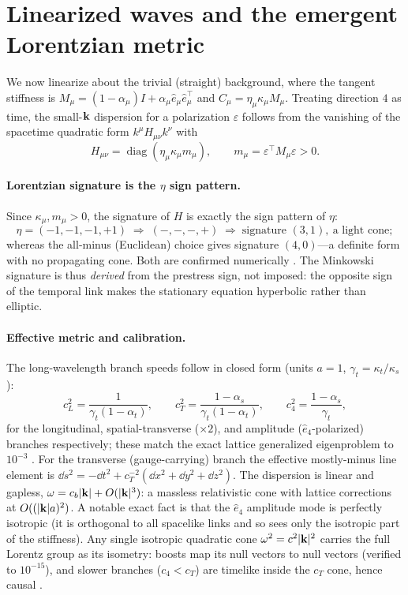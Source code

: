 \section{Linearized waves and the emergent Lorentzian metric}
\label{sec:metric}

We now linearize about the trivial (straight) background, where the tangent stiffness is
$M_\mu=(1-\alpha_\mu)I+\alpha_\mu\hat e_\mu\hat e_\mu^\top$ and $C_\mu=\eta_\mu\kappa_\mu M_\mu$.
Treating direction $4$ as time, the small-$\mathbf{k}$ dispersion for a polarization
$\varepsilon$ follows from the vanishing of the spacetime quadratic form $k^\mu H_{\mu\nu}k^\nu$
with
\begin{equation}
  H_{\mu\nu}=\operatorname{diag}(\eta_\mu\kappa_\mu m_\mu),\qquad m_\mu=\varepsilon^\top M_\mu\varepsilon>0.
  \label{eq:H}
\end{equation}

\paragraph{Lorentzian signature is the $\eta$ sign pattern.} Since $\kappa_\mu,m_\mu>0$, the
signature of $H$ is exactly the sign pattern of $\eta$:
\begin{equation}
  \eta=(-1,-1,-1,+1)\;\Rightarrow\;(-,-,-,+)\;\Rightarrow\;\text{signature }(3,1),\ \text{a light cone};
\end{equation}
whereas the all-minus (Euclidean) choice gives signature $(4,0)$---a definite form with no
propagating cone. Both are confirmed numerically \citep{repo}. The Minkowski signature is
thus \emph{derived} from the prestress sign, not imposed: the opposite sign of the temporal
link makes the stationary equation hyperbolic rather than elliptic.

\paragraph{Effective metric and calibration.} The long-wavelength branch speeds follow in
closed form (units $a=1$, $\gamma_t=\kappa_t/\kappa_s$):
\begin{equation}
  c_L^2=\frac{1}{\gamma_t(1-\alpha_t)},\qquad
  c_T^2=\frac{1-\alpha_s}{\gamma_t(1-\alpha_t)},\qquad
  c_4^2=\frac{1-\alpha_s}{\gamma_t},
  \label{eq:speeds}
\end{equation}
for the longitudinal, spatial-transverse ($\times 2$), and amplitude ($\hat e_4$-polarized)
branches respectively; these match the exact lattice generalized eigenproblem to $10^{-3}$
\citep{repo}. For the transverse (gauge-carrying) branch the effective mostly-minus line
element is $\dd s^2=-\dd t^2+c_T^{-2}(\dd x^2+\dd y^2+\dd z^2)$. The dispersion is linear and
gapless, $\omega=c_b|\mathbf{k}|+O(|\mathbf{k}|^3)$: a massless relativistic cone with lattice
corrections at $O((|\mathbf{k}|a)^2)$. A notable exact fact is that the $\hat e_4$ amplitude mode
is perfectly isotropic (it is orthogonal to all spacelike links and so sees only the
isotropic part of the stiffness). Any single isotropic quadratic cone $\omega^2=c^2|\mathbf{k}|^2$
carries the full Lorentz group as its isometry: boosts map its null vectors to null vectors
(verified to $10^{-15}$), and slower branches ($c_4<c_T$) are timelike inside the $c_T$ cone,
hence causal \citep{repo}.

